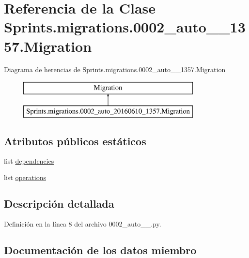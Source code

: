 \hypertarget{class_sprints_1_1migrations_1_10002__auto__20160610__1357_1_1_migration}{}\section{Referencia de la Clase Sprints.\+migrations.0002\+\_\+auto\+\_\+\_\+1357.Migration}
\label{class_sprints_1_1migrations_1_10002__auto__20160610__1357_1_1_migration}
Diagrama de herencias de Sprints.\+migrations.0002\+\_\+auto\+\_\+\_\+1357.Migration\begin{figure}[H]
\begin{center}
\leavevmode
\includegraphics[height=2.000000cm]{class_sprints_1_1migrations_1_10002__auto__20160610__1357_1_1_migration}
\end{center}
\end{figure}
\subsection*{Atributos públicos estáticos}
\begin{DoxyCompactItemize}
\item 
list \hyperlink{class_sprints_1_1migrations_1_10002__auto__20160610__1357_1_1_migration_a9b8f97eef16f1e8b633c70273c678e56}{dependencies}
\item 
list \hyperlink{class_sprints_1_1migrations_1_10002__auto__20160610__1357_1_1_migration_ae715f7d9f05cfc4c4931620d38ca7e8f}{operations}
\end{DoxyCompactItemize}


\subsection{Descripción detallada}


Definición en la línea 8 del archivo 0002\+\_\+auto\+\_\+\_.\+py.



\subsection{Documentación de los datos miembro}
